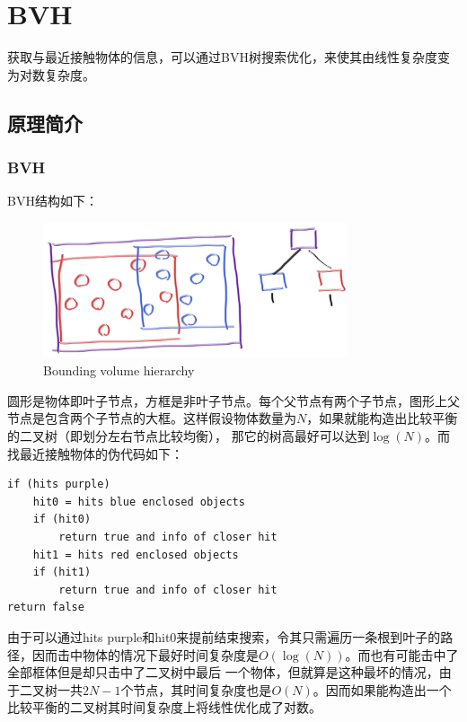 \documentclass[UTF8, a4paper, 11pt]{article}
\begin{document}
\section{BVH}
获取与最近接触物体的信息，可以通过BVH树搜索优化，来使其由线性复杂度变为对数复杂度。
\subsection{原理简介}
\subsubsection{BVH}
BVH结构如下：
\begin{figure}[H]
    \centering
    \includegraphics[width=0.8\textwidth]{bvh.jpg}
    \caption{Bounding volume hierarchy}
\end{figure}
圆形是物体即叶子节点，方框是非叶子节点。每个父节点有两个子节点，图形上父节点是包含两个子节点的大框。这样假设物体数量为$N$，如果就能构造出比较平衡的二叉树（即划分左右节点比较均衡），
那它的树高最好可以达到$\log(N)$。而找最近接触物体的伪代码如下：
\begin{lstlisting}
if (hits purple)
    hit0 = hits blue enclosed objects
    if (hit0)
        return true and info of closer hit
    hit1 = hits red enclosed objects
    if (hit1)
        return true and info of closer hit
return false
\end{lstlisting}
由于可以通过hits purple和hit0来提前结束搜索，令其只需遍历一条根到叶子的路径，因而击中物体的情况下最好时间复杂度是$O(\log(N))$。而也有可能击中了全部框体但是却只击中了二叉树中最后
一个物体，但就算是这种最坏的情况，由于二叉树一共$2N-1$个节点，其时间复杂度也是$O(N)$。因而如果能构造出一个比较平衡的二叉树其时间复杂度上将线性优化成了对数。
\end{document}
